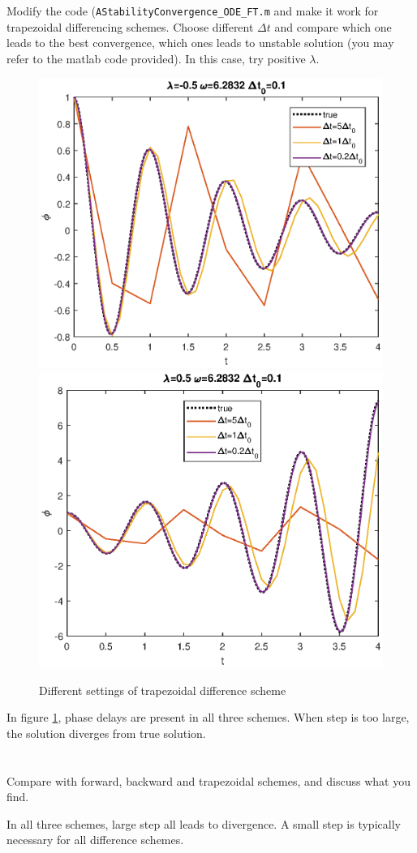 \section{}
Modify the code (\verb|AStabilityConvergence_ODE_FT.m| and make it work for trapezoidal differencing schemes. Choose different $\Delta t$ and compare which one leads to the best convergence, which ones leads to unstable solution (you may refer to the matlab code provided). In this case, try positive $\lambda$.

\begin{figure}[!htbp]
    \includegraphics[width=0.45\linewidth]{hw1/trapezoidal_1}
    \includegraphics[width=0.45\linewidth]{hw1/trapezoidal_2}
    \caption{Different settings of trapezoidal difference scheme}
    \label{fig:trapezoidal}
\end{figure}
In figure \ref{fig:trapezoidal}, phase delays are present in all three schemes. When step is too large, the solution diverges from true solution.

\section{}
Compare with forward, backward and trapezoidal schemes, and discuss what you find.

In all three schemes, large step all leads to divergence. A small step is typically necessary for all difference schemes.